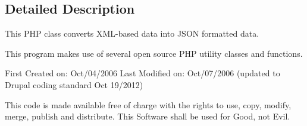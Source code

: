 \subsection{Detailed Description}
This P\-H\-P class converts X\-M\-L-\/based data into J\-S\-O\-N formatted data.

This program makes use of several open source P\-H\-P utility classes and functions.

First Created on\-: Oct/04/2006 Last Modified on\-: Oct/07/2006 (updated to Drupal coding standard Oct 19/2012)

This code is made available free of charge with the rights to use, copy, modify, merge, publish and distribute. This Software shall be used for Good, not Evil. 